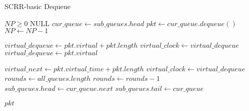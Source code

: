 \begin{algorithm}[b!]
\caption{SCRR-basic Dequeue}
\label{alg:scrr-basic-deq}
\begin{algorithmic}
\Require $NP \ge 0$
\Return NULL
\EndIf
\State $cur\_queue \gets sub\_queues.head$
\State $pkt \gets cur\_queue.dequeue()$
\State $NP \gets NP - 1$

\State $virtual\_dequeue \gets pkt.virtual + pkt.length$
\State $virtual\_clock \gets virtual\_dequeue$
\State $virtual\_dequeue \gets pkt.virtual$
\EndIf

\State $virtual\_next \gets pkt.virtual\_time + pkt.length$
\State $virtual\_clock \gets virtual\_dequeue$
\State $rounds \gets all\_queues.length$
\EndIf
\State $rounds \gets rounds - 1$
\State $sub\_queues.head \gets cur\_queue.next$
\State $sub\_queues.tail \gets cur\_queue$
\EndIf
\EndIf

\Return $pkt$
\EndFunction
\end{algorithmic}
\end{algorithm}
